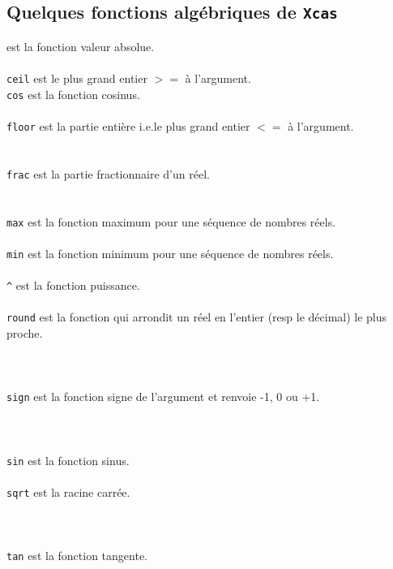 \documentclass[12pt,a4paper]{book}
\begin{document}
\begin{giacjshere}
\subsection{Quelques fonctions alg\'ebriques de {\tt Xcas}}
 est la fonction valeur absolue.\\
\\
{\tt ceil} est le plus grand entier $>=$ \`a l'argument.\\
{\tt cos} est la fonction cosinus.\\
\\
{\tt floor} est la partie enti\`ere i.e.le plus grand entier $<=$ \`a 
l'argument.\\
\\
\\
{\tt frac} est la partie fractionnaire d'un r\'eel.\\
\\
\\
{\tt max} est la fonction maximum pour une s\'equence de nombres r\'eels.\\
\\
{\tt min} est la fonction minimum pour une s\'equence de nombres r\'eels.\\
\\
{\tt \verb|^|} est la fonction puissance.\\
\\
{\tt round} est la fonction qui arrondit un r\'eel en l'entier (resp le d\'ecimal) le plus proche.\\
\\
\\
\\
{\tt sign} est la fonction signe de l'argument et renvoie -1, 0 ou +1.\\
\\
\\
\\
{\tt sin} est la fonction sinus.\\
\\
{\tt sqrt} est la racine carr\'ee.\\
\\
\\
\\
{\tt tan} est la fonction tangente.\\


\end{giacjshere}
\end{document}
